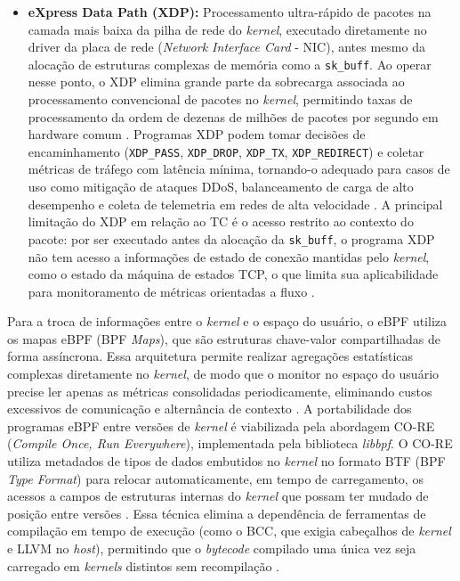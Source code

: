\begin{itemize}
    \item \textbf{eXpress Data Path (XDP):} Processamento ultra-rápido de pacotes na camada mais baixa da pilha de rede do \textit{kernel}, executado diretamente no driver da placa de rede (\textit{Network Interface Card} - NIC), antes mesmo da alocação de estruturas complexas de memória como a \texttt{sk\_buff}. Ao operar nesse ponto, o XDP elimina grande parte da sobrecarga associada ao processamento convencional de pacotes no \textit{kernel}, permitindo taxas de processamento da ordem de dezenas de milhões de pacotes por segundo em hardware comum \cite{10.1145/3594255.3594256}. Programas XDP podem tomar decisões de encaminhamento (\texttt{XDP\_PASS}, \texttt{XDP\_DROP}, \texttt{XDP\_TX}, \texttt{XDP\_REDIRECT}) e coletar métricas de tráfego com latência mínima, tornando-o adequado para casos de uso como mitigação de ataques DDoS, balanceamento de carga de alto desempenho e coleta de telemetria em redes de alta velocidade \cite{technologies12080122, 10.1145/3594255.3594256}. A principal limitação do XDP em relação ao TC é o acesso restrito ao contexto do pacote: por ser executado antes da alocação da \texttt{sk\_buff}, o programa XDP não tem acesso a informações de estado de conexão mantidas pelo \textit{kernel}, como o estado da máquina de estados TCP, o que limita sua aplicabilidade para monitoramento de métricas orientadas a fluxo \cite{gregg_bpf_2019, shahinfar2025demystifying}.
\end{itemize}

Para a troca de informações entre o \textit{kernel} e o espaço do usuário, o eBPF utiliza os mapas eBPF (BPF \textit{Maps}), que são estruturas chave-valor compartilhadas de forma assíncrona. Essa arquitetura permite realizar agregações estatísticas complexas diretamente no \textit{kernel}, de modo que o monitor no espaço do usuário precise ler apenas as métricas consolidadas periodicamente, eliminando custos excessivos de comunicação e alternância de contexto \cite{gregg_bpf_2019}. A portabilidade dos programas eBPF entre versões de \textit{kernel} é viabilizada pela abordagem CO-RE (\textit{Compile Once, Run Everywhere}), implementada pela biblioteca \textit{libbpf}. O CO-RE utiliza metadados de tipos de dados embutidos no \textit{kernel} no formato BTF (BPF \textit{Type Format}) para relocar automaticamente, em tempo de carregamento, os acessos a campos de estruturas internas do \textit{kernel} que possam ter mudado de posição entre versões \cite{nakryiko2020core}. Essa técnica elimina a dependência de ferramentas de compilação em tempo de execução (como o BCC, que exigia cabeçalhos de \textit{kernel} e LLVM no \textit{host}), permitindo que o \textit{bytecode} compilado uma única vez seja carregado em \textit{kernels} distintos sem recompilação \cite{nakryiko2020core, gregg_bpf_2019}.

